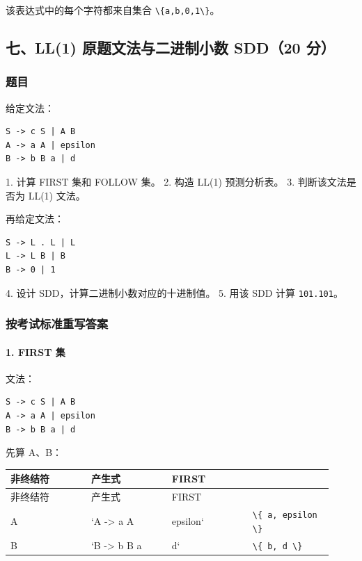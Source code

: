 \documentclass[UTF8]{ctexart}
\begin{document}
该表达式中的每个字符都来自集合 \texttt{\textbackslash{}\{a,b,0,1\textbackslash{}\}}。

\subsection*{七、LL(1) 原题文法与二进制小数 SDD（20 分）}

\subsubsection*{题目}

给定文法：

\begin{Verbatim}[fontsize=\small,breaklines=true]
S -> c S | A B
A -> a A | epsilon
B -> b B a | d
\end{Verbatim}

1. 计算 FIRST 集和 FOLLOW 集。 2. 构造 LL(1) 预测分析表。 3. 判断该文法是否为 LL(1) 文法。

再给定文法：

\begin{Verbatim}[fontsize=\small,breaklines=true]
S -> L . L | L
L -> L B | B
B -> 0 | 1
\end{Verbatim}

4. 设计 SDD，计算二进制小数对应的十进制值。 5. 用该 SDD 计算 \texttt{101.101}。

\subsubsection*{按考试标准重写答案}

\paragraph*{1. FIRST 集}

文法：

\begin{Verbatim}[fontsize=\small,breaklines=true]
S -> c S | A B
A -> a A | epsilon
B -> b B a | d
\end{Verbatim}

先算 A、B：

\begin{longtable}{|p{0.23\linewidth}|p{0.23\linewidth}|p{0.23\linewidth}|p{0.23\linewidth}|}
\hline
非终结符 & 产生式 & FIRST &  \\
\hline
\endfirsthead
非终结符 & 产生式 & FIRST &  \\
\hline
\endhead
A & `A -> a A & epsilon` & \texttt{\textbackslash{}\{ a, epsilon \textbackslash{}\}} \\
\hline
B & `B -> b B a & d` & \texttt{\textbackslash{}\{ b, d \textbackslash{}\}} \\
\hline
\end{longtable}
\end{document}
